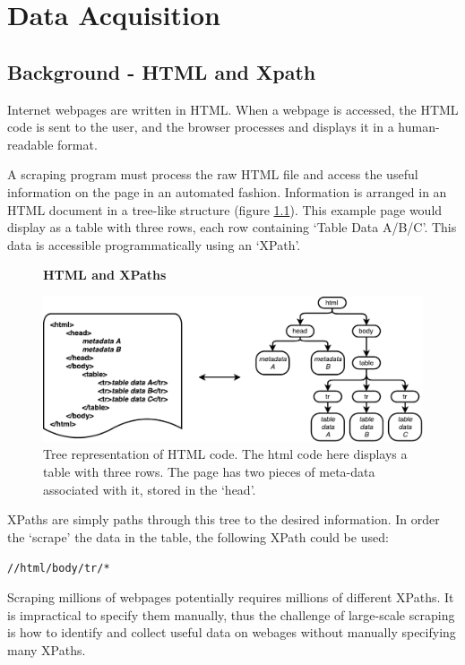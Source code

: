 \chapter{Data Acquisition}
\label{chapt:DATA_ACQUISITION}
\section{Background - HTML and Xpath}

Internet webpages are written in HTML. When a webpage is accessed, the HTML code is sent to the user, and the browser processes and displays it in a human-readable format. 

A scraping program must process the raw HTML file and access the useful information on the page in an automated fashion. Information is arranged in an HTML document in a tree-like structure (figure \ref{fig:HTMLTREE}). This example page would display as a table with three rows, each row containing `Table Data A/B/C'. This data is accessible programmatically using an `XPath'. 
\begin{figure}[H]
    \centering
    \textbf{HTML and XPaths}\par\medskip
    \includegraphics[width=\textwidth]{Data_Acquisition/html_tree.pdf}
    \caption[Tree representation of HTML Code]{Tree representation of HTML code. The html code here displays a table with three rows. The page has two pieces of meta-data associated with it, stored in the `head'.}
\label{fig:HTMLTREE}
\end{figure}
XPaths are simply paths through this tree to the desired information. In order the `scrape' the data in the table, the following XPath could be used:
\begin{center}
\texttt{//html/body/tr/*}
\end{center}
Scraping millions of webpages potentially requires millions of different XPaths. It is impractical to specify them manually, thus the challenge of large-scale scraping is how to identify and collect useful data on webages without manually specifying many XPaths.
